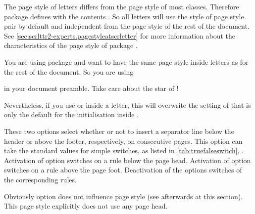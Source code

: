 The  page style of letters differs from the 
page style of most classes. Therefore package  defines
 with the contents
. So all letters will use
the  style of page style pair
 by default and independent from the
page style of the rest of the document. See
\autoref{sec:scrlttr2-experts.pagestyleatscrletter} for more information about
the characteristics of the page style of package .
\begin{Example}
  You are using package  and want to have the same page
  style inside letters as for the rest of the document. So you are using
\begin{lstcode}
  \renewcommand*{\letterpagestyle}{}
\end{lstcode}
  in your document preamble. Take care about the star of
  !
\end{Example}
Nevertheless, if you use  or  inside a
letter, this will overwrite the setting of  that is
only the default for the initialisation inside
.%
\EndIndexGroup


\begin{Declaration}
\end{Declaration}
These two options select whether or not to insert a separator
line below the header or above the
footer, respectively, on consecutive pages.  This option can take the standard
values for simple switches, as listed in \autoref{tab:truefalseswitch},
.
Activation of option
 switches on a rule below the page
head. Activation of option
 switches on a rule above the page foot. Deactivation of
the options switches of the corresponding rules.

Obviously option  does not influence page style
 (see afterwards at this
section). This page style explicitly does not use any page head.

